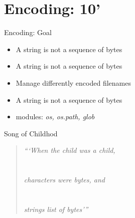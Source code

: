 \section{Encoding: 10'}



\begin{frame}[fragile]{Encoding: Goal}
\begin{itemize}
\item A string is not a sequence of bytes
\item A string is not a sequence of bytes
\item Manage differently encoded filenames 
\item A string is not a sequence of bytes
\item modules: \emph{os, os.path, glob}
\end{itemize}
\end{frame}


\begin{frame}{Song of Childhod}
\begin{verse}
\begin{center}
\emph{```When the child was a child,\\
\\
\\
characters were bytes, and\\
\\
\\
strings list of bytes'''}

\end{center}
\end{verse}
\end{frame}


